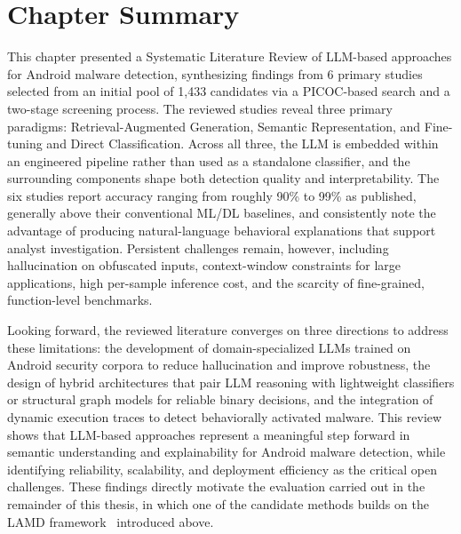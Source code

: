 \section{Chapter Summary}\label{sec:conclusion}

This chapter presented a Systematic Literature Review of LLM-based approaches for Android malware detection, synthesizing findings from 6 primary studies selected from an initial pool of 1,433 candidates via a PICOC-based search and a two-stage screening process. The reviewed studies reveal three primary paradigms: Retrieval-Augmented Generation, Semantic Representation, and Fine-tuning and Direct Classification. Across all three, the LLM is embedded within an engineered pipeline rather than used as a standalone classifier, and the surrounding components shape both detection quality and interpretability. The six studies report accuracy ranging from roughly 90\% to 99\% as published, generally above their conventional ML/DL baselines, and consistently note the advantage of producing natural-language behavioral explanations that support analyst investigation. Persistent challenges remain, however, including hallucination on obfuscated inputs, context-window constraints for large applications, high per-sample inference cost, and the scarcity of fine-grained, function-level benchmarks.

Looking forward, the reviewed literature converges on three directions to address these limitations: the development of domain-specialized LLMs trained on Android security corpora to reduce hallucination and improve robustness, the design of hybrid architectures that pair LLM reasoning with lightweight classifiers or structural graph models for reliable binary decisions, and the integration of dynamic execution traces to detect behaviorally activated malware. This review shows that LLM-based approaches represent a meaningful step forward in semantic understanding and explainability for Android malware detection, while identifying reliability, scalability, and deployment efficiency as the critical open challenges. These findings directly motivate the evaluation carried out in the remainder of this thesis, in which one of the candidate methods builds on the LAMD framework~\cite{Qian2025-ua} introduced above.
